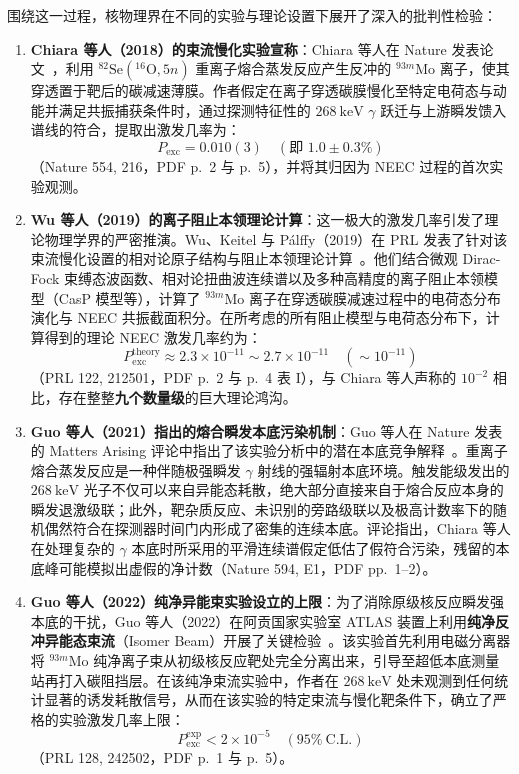 围绕这一过程，核物理界在不同的实验与理论设置下展开了深入的批判性检验：
\begin{enumerate}
\item \textbf{Chiara 等人（2018）的束流慢化实验宣称}：Chiara 等人在 Nature 发表论文~\cite{chiara-2018-mo93m-isomer-depletion-neec}，利用 $^{82}\mathrm{Se}(^{16}\mathrm{O}, 5n)$ 重离子熔合蒸发反应产生反冲的 $^{93m}\mathrm{Mo}$ 离子，使其穿透置于靶后的碳减速薄膜。作者假定在离子穿透碳膜慢化至特定电荷态与动能并满足共振捕获条件时，通过探测特征性的 $268\ \mathrm{keV}$ $\gamma$ 跃迁与上游瞬发馈入谱线的符合，提取出激发几率为：
\begin{equation}\label{eq:4-8-chiara-value}
P_{\mathrm{exc}} = 0.010(3) \quad (\text{即 } 1.0 \pm 0.3\%)
\end{equation}
（Nature 554, 216，PDF p.~2 与 p.~5），并将其归因为 NEEC 过程的首次实验观测。
\item \textbf{Wu 等人（2019）的离子阻止本领理论计算}：这一极大的激发几率引发了理论物理学界的严密推演。Wu、Keitel 与 P\'alffy（2019）在 PRL 发表了针对该束流慢化设置的相对论原子结构与阻止本领理论计算~\cite{wu-2019-mo93m-neec-stopping-theory}。他们结合微观 Dirac-Fock 束缚态波函数、相对论扭曲波连续谱以及多种高精度的离子阻止本领模型（CasP 模型等），计算了 $^{93m}\mathrm{Mo}$ 离子在穿透碳膜减速过程中的电荷态分布演化与 NEEC 共振截面积分。在所考虑的所有阻止模型与电荷态分布下，计算得到的理论 NEEC 激发几率约为：
\begin{equation}\label{eq:4-8-wu-theory-value}
P_{\mathrm{exc}}^{\mathrm{theory}} \approx 2.3 \times 10^{-11} \sim 2.7 \times 10^{-11} \quad (\sim 10^{-11})
\end{equation}
（PRL 122, 212501，PDF p.~2 与 p.~4 表 I），与 Chiara 等人声称的 $10^{-2}$ 相比，存在整整\textbf{九个数量级}的巨大理论鸿沟。
\item \textbf{Guo 等人（2021）指出的熔合瞬发本底污染机制}：Guo 等人在 Nature 发表的 Matters Arising 评论中指出了该实验分析中的潜在本底竞争解释~\cite{guo-2021-mo93m-depletion-contamination-challenge}。重离子熔合蒸发反应是一种伴随极强瞬发 $\gamma$ 射线的强辐射本底环境。触发能级发出的 $268\ \mathrm{keV}$ 光子不仅可以来自异能态耗散，绝大部分直接来自于熔合反应本身的瞬发退激级联；此外，靶杂质反应、未识别的旁路级联以及极高计数率下的随机偶然符合在探测器时间门内形成了密集的连续本底。评论指出，Chiara 等人在处理复杂的 $\gamma$ 本底时所采用的平滑连续谱假定低估了假符合污染，残留的本底峰可能模拟出虚假的净计数（Nature 594, E1，PDF pp.~1--2）。
\item \textbf{Guo 等人（2022）纯净异能束实验设立的上限}：为了消除原级核反应瞬发强本底的干扰，Guo 等人（2022）在阿贡国家实验室 ATLAS 装置上利用\textbf{纯净反冲异能态束流}（Isomer Beam）开展了关键检验~\cite{guo-2022-mo93m-isomer-beam-depletion-limit}。该实验首先利用电磁分离器将 $^{93m}\mathrm{Mo}$ 纯净离子束从初级核反应靶处完全分离出来，引导至超低本底测量站再打入碳阻挡层。在该纯净束流实验中，作者在 $268\ \mathrm{keV}$ 处未观测到任何统计显著的诱发耗散信号，从而在该实验的特定束流与慢化靶条件下，确立了严格的实验激发几率上限：
\begin{equation}\label{eq:4-8-guo-limit-value}
P_{\mathrm{exc}}^{\mathrm{exp}} < 2 \times 10^{-5} \quad (95\%\ \mathrm{C.L.})
\end{equation}
（PRL 128, 242502，PDF p.~1 与 p.~5）。
\end{enumerate}

